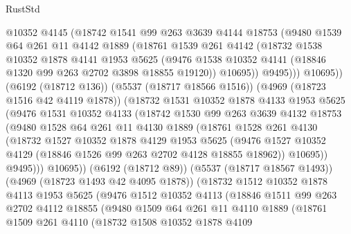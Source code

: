 \begin{lexlean}{RustStd}
\begin{coremodule}
              @10352
              @4145
              (@18742
                @1541
                @99
                @263
                @3639
                @4144
                @18753
                (@9480
                  @1539
                  @64
                  @261
                  @11
                  @4142
                  @1889
                  (@18761
                    @1539
                    @261
                    @4142
                    (@18732
                      @1538
                      @10352
                      @1878
                      @4141
                      @1953
                      @5625
                      (@9476 @1538 @10352 @4141 (@18846 @1320 @99 @263 @2702 @3898 @18855 @19120))
                      @10695))
                  @9495)))
            @10695))
        (@6192 (@18712 @136))
        (@5537 (@18717 @18566 @1516))
        (@4969 (@18723 @1516 @42 @4119 @1878))
        (@18732
          @1531
          @10352
          @1878
          @4133
          @1953
          @5625
          (@9476
            @1531
            @10352
            @4133
            (@18742
              @1530
              @99
              @263
              @3639
              @4132
              @18753
              (@9480
                @1528
                @64
                @261
                @11
                @4130
                @1889
                (@18761
                  @1528
                  @261
                  @4130
                  (@18732
                    @1527
                    @10352
                    @1878
                    @4129
                    @1953
                    @5625
                    (@9476 @1527 @10352 @4129 (@18846 @1526 @99 @263 @2702 @4128 @18855 @18962))
                    @10695))
                @9495)))
          @10695))
      (@6192 (@18712 @89))
      (@5537 (@18717 @18567 @1493))
      (@4969 (@18723 @1493 @42 @4095 @1878))
      (@18732
        @1512
        @10352
        @1878
        @4113
        @1953
        @5625
        (@9476
          @1512
          @10352
          @4113
          (@18846
            @1511
            @99
            @263
            @2702
            @4112
            @18855
            (@9480
              @1509
              @64
              @261
              @11
              @4110
              @1889
              (@18761
                @1509
                @261
                @4110
                (@18732
                  @1508
                  @10352
                  @1878
                  @4109

\end{coremodule}
\end{lexlean}
